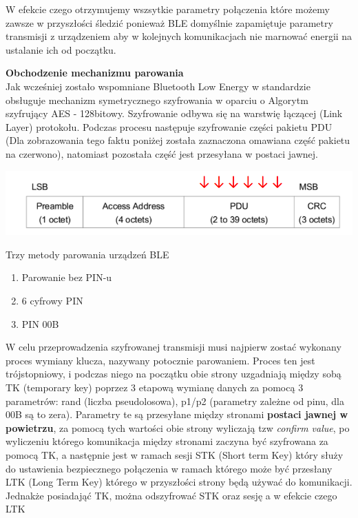 W efekcie czego otrzymujemy wszsytkie parametry połączenia które możemy zawsze w przyszłości śledzić ponieważ BLE domyślnie zapamiętuje parametry transmisji z urządzeniem aby w kolejnych komunikacjach nie marnować energii na ustalanie ich od początku. \\

\par
\tab \textbf{Obchodzenie mechanizmu parowania} \\
Jak wcześniej zostało wspomniane Bluetooth Low Energy w standardzie obsługuje mechanizm symetrycznego szyfrowania w oparciu o Algorytm szyfrujący AES - 128bitowy. Szyfrowanie odbywa się na warstwię łączącej (Link Layer) protokołu. Podczas procesu następuje szyfrowanie części pakietu PDU (Dla zobrazowania tego faktu poniżej została zaznaczona omawiana część pakietu na czerwono), natomiast pozostała część jest przesyłana w postaci jawnej.\\

\centerline{
	\includegraphics[scale=0.35]{./img/AES_PDU_crypt.png}
}
Trzy metody parowania urządzeń BLE
\begin{enumerate}
	\item Parowanie bez PIN-u
	\item 6 cyfrowy PIN
	\item PIN 00B	
\end{enumerate} 

\tab W celu przeprowadzenia szyfrowanej transmisji musi najpierw zostać wykonany proces wymiany klucza, nazywany potocznie parowaniem. Proces ten jest trójstopniowy, i podczas niego na początku obie strony uzgadniają między sobą TK (temporary key) poprzez 3 etapową wymianę danych za pomocą 3 parametrów: rand (liczba pseudolosowa), p1/p2 (parametry zależne od pinu, dla 00B są to zera). Parametry te są przesyłane między stronami \textbf{postaci jawnej w powietrzu}, za pomocą tych wartości obie strony wyliczają tzw \textit{confirm value}, po wyliczeniu którego komunikacja między stronami zaczyna być szyfrowana za pomocą TK, a następnie jest w ramach sesji STK (Short term Key) który służy do ustawienia bezpiecznego połączenia w ramach którego może być przesłany LTK (Long Term Key) którego w przyszłości strony będą używać do komunikacji.
Jednakże posiadająć TK, można odszyfrować STK oraz sesję a w efekcie czego LTK

